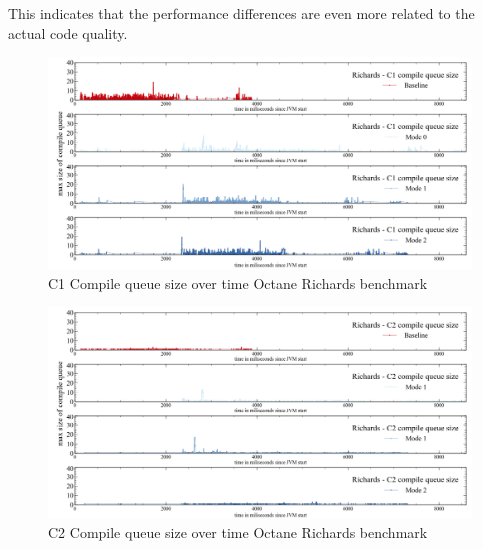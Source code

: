 \\\\
This indicates that the performance differences are even more related to the actual code quality.
\begin{figure}[ht]
  \begin{center}
    \centering
    \includegraphics[width=1.0\textwidth]{figures/octane_queue_richards_separate_c1.png}
    \caption{C1 Compile queue size over time Octane Richards benchmark}
    \label{f:octane_queue_richards_separate_c1}
  \end{center}
\end{figure}
\begin{figure}[ht]
  \begin{center}
    \centering
    \includegraphics[width=1.0\textwidth]{figures/octane_queue_richards_separate_c2.png}
    \caption{C2 Compile queue size over time Octane Richards benchmark}
    \label{f:octane_queue_richards_separate_c2}
  \end{center}
\end{figure}
